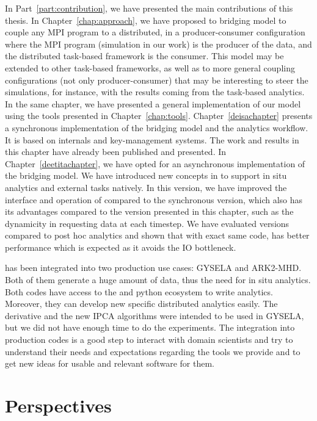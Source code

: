 In Part~\ref{part:contribution}, we have presented the main contributions of this thesis. 
In Chapter~\ref{chap:approach}, we have proposed to bridging model to couple any MPI program to a \dask distributed, in a producer-consumer configuration where the MPI program (simulation in our work) is the producer of the data, and the distributed task-based framework is the consumer. 
This model may be extended to other task-based frameworks, as well as to more general coupling configurations (not only producer-consumer) that may be interesting to steer the simulations, for instance, with the results coming from the task-based analytics.    
In the same chapter, we have presented a general implementation of our model using the tools presented in Chapter~\ref{chap:tools}. 
Chapter~\ref{deisachapter} presents a synchronous implementation of the bridging model and the analytics workflow. It is based on \dask internals and key-management systems. The work and results in this chapter have already been published and presented. 
In Chapter~\ref{deetitachapter}, we have opted for an asynchronous implementation of the bridging model. We have introduced new concepts in \dask to support in situ analytics and external tasks natively. In this version, we have improved the interface and operation of \deisa compared to the synchronous version, which also has its advantages compared to the version presented in this chapter, such as the dynamicity in requesting data at each timestep.
We have evaluated \deisa versions compared to post hoc analytics and shown that with exact same code, \deisa has better performance which is expected as it avoids the IO bottleneck.

\deisa has been integrated into two production use cases: GYSELA and ARK2-MHD. Both of them generate a huge amount of data, thus the need for in situ analytics. Both codes have access to the \dask and python ecosystem to write analytics. Moreover, they can develop new specific distributed analytics easily. The derivative and the new IPCA algorithms were intended to be used in GYSELA, but we did not have enough time to do the experiments.     
The integration into production codes is a good step to interact with domain scientists and try to understand their needs and expectations regarding the tools we provide and to get new ideas for usable and relevant software for them.

\section{Perspectives}

